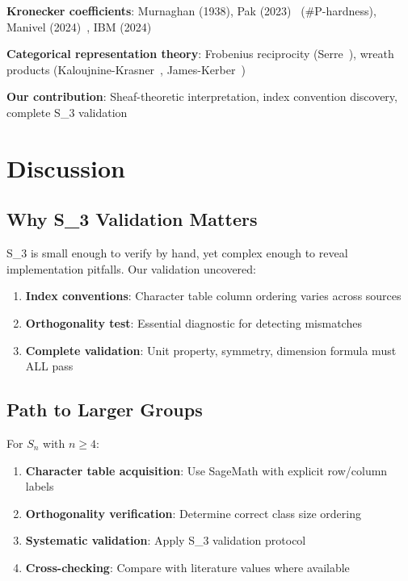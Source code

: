 \documentclass[11pt]{article}
\theoremstyle{definition}
\theoremstyle{remark}
\begin{document}
\textbf{Kronecker coefficients}: Murnaghan (1938), Pak (2023)~\cite{pak2023} (\#P-hardness), Manivel (2024)~\cite{manivel2024}, IBM (2024)~\cite{ibm2024}

\textbf{Categorical representation theory}: Frobenius reciprocity (Serre~\cite{serre1977}), wreath products (Kaloujnine-Krasner~\cite{kaloujnine1951}, James-Kerber~\cite{james1981})

\textbf{Our contribution}: Sheaf-theoretic interpretation, index convention discovery, complete S_3 validation

\section{Discussion}

\subsection{Why S_3 Validation Matters}

S_3 is small enough to verify by hand, yet complex enough to reveal implementation pitfalls. Our validation uncovered:

\begin{enumerate}
\item \textbf{Index conventions}: Character table column ordering varies across sources
\item \textbf{Orthogonality test}: Essential diagnostic for detecting mismatches
\item \textbf{Complete validation}: Unit property, symmetry, dimension formula must ALL pass
\end{enumerate}

\subsection{Path to Larger Groups}

For $S_n$ with $n \geq 4$:

\begin{enumerate}
\item \textbf{Character table acquisition}: Use SageMath with explicit row/column labels
\item \textbf{Orthogonality verification}: Determine correct class size ordering
\item \textbf{Systematic validation}: Apply S_3 validation protocol
\item \textbf{Cross-checking}: Compare with literature values where available
\end{enumerate}
\end{document}
